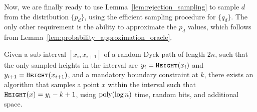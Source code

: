 Now, we are finally ready to use Lemma~\ref{lem:rejection_sampling} to sample $d$ from the distribution $\{p_d\}$,
using the efficient sampling procedure for $\{q_d\}$.
The only other requirement is the ability to approximate the $p_d$ values, which follows from Lemma~\ref{lem:probability_approximation_oracle}.
\begin{theorem}
\label{thm:first_return_in_interval}
Given a sub-interval $[x_{i},x_{i+1}]$ of a random Dyck path of length $2n$,
such that the only sampled heights in the interval are $y_i=\texttt{\textsc{Height}}(x_i)$ and $y_{i+1}=\texttt{\textsc{Height}}(x_{i+1})$,
and a mandatory boundary constraint at $k$,
there exists an algorithm that samples a point $x$ within the interval such that $\texttt{\textsc{Height}}(x) = y_i-k+1$,
using $\mathrm{poly}(\log n)$ time, random bits, and additional space.
\end{theorem}



